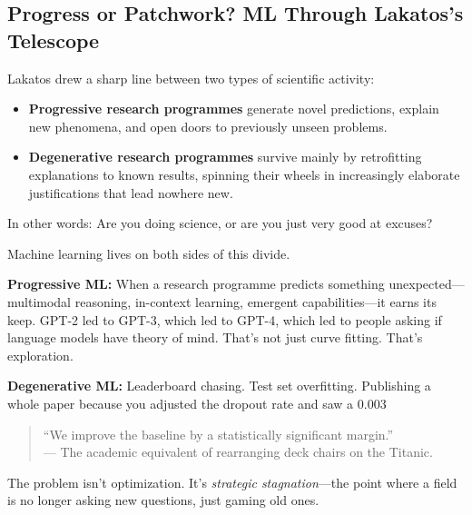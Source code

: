 \subsection{Progress or Patchwork? ML Through Lakatos’s Telescope}

Lakatos drew a sharp line between two types of scientific activity:

\begin{itemize}
  \item \textbf{Progressive research programmes} generate novel predictions, explain new phenomena, and open doors to previously unseen problems.
  \item \textbf{Degenerative research programmes} survive mainly by retrofitting explanations to known results, spinning their wheels in increasingly elaborate justifications that lead nowhere new.
\end{itemize}

In other words: Are you doing science, or are you just very good at excuses?

Machine learning lives on both sides of this divide.

\bigskip

\textbf{Progressive ML:}  
When a research programme predicts something unexpected—multimodal reasoning, in-context learning, emergent capabilities—it earns its keep. GPT-2 led to GPT-3, which led to GPT-4, which led to people asking if language models have theory of mind. That’s not just curve fitting. That’s exploration.

\bigskip

\textbf{Degenerative ML:}  
Leaderboard chasing. Test set overfitting. Publishing a whole paper because you adjusted the dropout rate and saw a 0.003%

\begin{quote}
    “We improve the baseline by a statistically significant margin.”\\
    — The academic equivalent of rearranging deck chairs on the Titanic.
\end{quote}

The problem isn’t optimization. It’s \textit{strategic stagnation}—the point where a field is no longer asking new questions, just gaming old ones.

